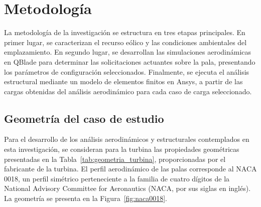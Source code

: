 \chapter{Metodología}

La metodología de la investigación se estructura en tres etapas principales. En primer lugar, se caracterizan el recurso eólico y las condiciones ambientales del emplazamiento. En segundo lugar, se desarrollan las simulaciones aerodinámicas en QBlade para determinar las solicitaciones actuantes sobre la pala, presentando los parámetros de configuración seleccionados. Finalmente, se ejecuta el análisis estructural mediante un modelo de elementos finitos en Ansys, a partir de las cargas obtenidas del análisis aerodinámico para cada caso de carga seleccionado.

\section{Geometría del caso de estudio}

Para el desarrollo de los análisis aerodinámicos y estructurales contemplados en esta investigación, se consideran para la turbina las propiedades geométricas presentadas en la Tabla~\ref{tab:geometria_turbina}, proporcionadas por el fabricante de la turbina. El perfil aerodinámico de las palas corresponde al NACA 0018, un perfil simétrico perteneciente a la familia de cuatro dígitos de la National Advisory Committee for Aeronautics (NACA, por sus siglas en inglés). La geometría se presenta en la Figura~\ref{fig:naca0018}.

